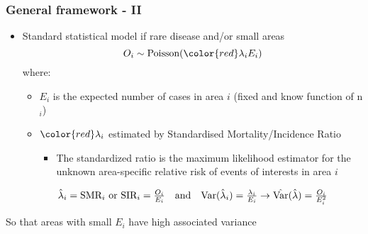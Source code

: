 \documentclass[12pt]{beamer}
\begin{document}
\begin{frame}
    \frametitle{General framework - II}
\begin{itemize}\setlength\itemsep{\fill}
\item Standard statistical model if rare disease and/or small areas
$$O_i \sim \hbox{Poisson}({\color{red}\lambda_i} E_i)$$
where:
\begin{itemize}\setlength\itemsep{\fill}
\item $E_i$ is the expected number of cases in area $i$ (fixed and know function of n$_i$)
\item ${\color{red}\lambda_i}$ estimated by Standardised Mortality/Incidence Ratio
\begin{itemize} \setlength\itemsep{\fill}
\item The standardized ratio is the maximum likelihood estimator for the unknown area-specific relative risk of events of interests in area $i$
\end{itemize}
\end{itemize}
\vspace{10pt}
\begin{equation*}
\begin{array}{ccc}
\hat{\lambda}_i = \hbox{SMR}_i \hbox{ or SIR}_i  =  \frac{O_i}{E_i} & \text{and} &\hbox{Var}(\hat{\lambda}_i) =  \frac{\lambda_i}{E_i} \rightarrow \hat{\hbox{Var}}(\hat{\lambda}) =  \frac{O_i}{E_i^2}
\end{array}
\end{equation*}
\end{itemize}

So that areas with small $E_{i}$ have high associated variance

\vspace{1cm}
\end{frame}
\end{document}
